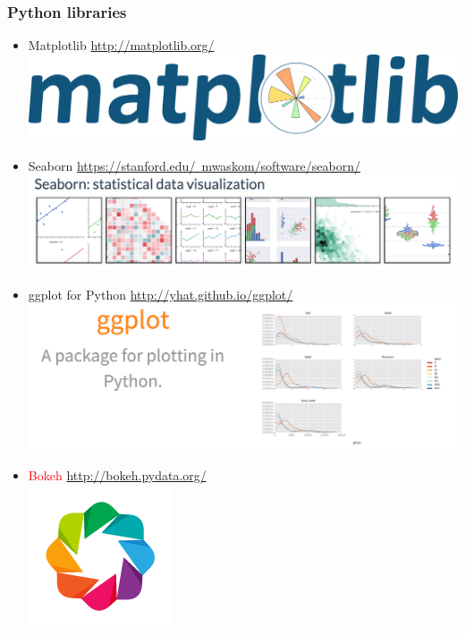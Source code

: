 
\begin{frame}
  \frametitle{Python libraries}
      \begin{itemize}  
        \item \textcolor{hutton_green}{Matplotlib} \href{http://matplotlib.org/}{http://matplotlib.org/} \\
         \includegraphics[height=0.1\textheight]{images/matplotlib_logo}
        \item \textcolor{hutton_blue}{Seaborn} \href{https://stanford.edu/~mwaskom/software/seaborn/}{https://stanford.edu/~mwaskom/software/seaborn/} \\
          \includegraphics[height=0.1\textheight]{images/seaborn}
        \item \textcolor{hutton_purple}{ggplot} for Python \href{http://yhat.github.io/ggplot/}{http://yhat.github.io/ggplot/} \\
          \includegraphics[height=0.1\textheight]{images/ggplot_python}
        \item \textcolor{red}{Bokeh} \href{http://bokeh.pydata.org/}{http://bokeh.pydata.org/} \\
          \includegraphics[height=0.1\textheight]{images/bokeh_logo}
      \end{itemize}  
\end{frame}